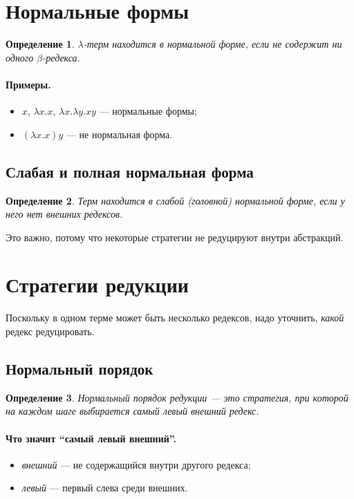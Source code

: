\documentclass[12pt,a4paper]{article}
\newtheorem{definition}{Определение}
\theoremstyle{remark}
\begin{document}
\section{Нормальные формы}

\begin{definition}
$\lambda$-терм находится в \emph{нормальной форме}, если не содержит ни одного $\beta$-редекса.
\end{definition}

\paragraph{Примеры.}
\begin{itemize}
    \item $x$, $\lambda x.x$, $\lambda x.\lambda y.xy$ --- нормальные формы;
    \item $(\lambda x.x)y$ --- не нормальная форма.
\end{itemize}

\subsection{Слабая и полная нормальная форма}

\begin{definition}
Терм находится в \emph{слабой (головной) нормальной форме}, если у него нет \emph{внешних} редексов.
\end{definition}

Это важно, потому что некоторые стратегии не редуцируют внутри абстракций.

\section{Стратегии редукции}

Поскольку в одном терме может быть несколько редексов, надо уточнить, \emph{какой} редекс редуцировать.

\subsection{Нормальный порядок}

\begin{definition}
\emph{Нормальный порядок редукции} --- это стратегия, при которой на каждом шаге выбирается \emph{самый левый внешний} редекс.
\end{definition}

\paragraph{Что значит ``самый левый внешний''.}
\begin{itemize}
    \item \emph{внешний} --- не содержащийся внутри другого редекса;
    \item \emph{левый} --- первый слева среди внешних.
\end{itemize}
\end{document}
